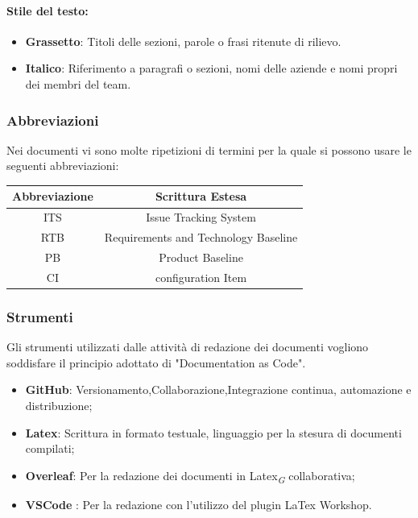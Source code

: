 \documentclass{article}
\begin{document}
\begin{enumerate}
\paragraph*{Stile del testo:}
\begin{itemize}
    \item \textbf{Grassetto}: Titoli delle sezioni, parole o frasi ritenute di rilievo.
    \item \textbf{Italico}: Riferimento a paragrafi o sezioni, nomi delle aziende e nomi propri dei membri del team.
\end{itemize}
\subsubsection{Abbreviazioni}
Nei documenti vi sono molte ripetizioni di termini per la quale si possono usare le seguenti abbreviazioni:\\
\vspace{0.2cm}
\begin{tabular}{|c|c|}
    \hline
    \textbf{Abbreviazione} & \textbf{Scrittura Estesa}            \\
    \hline
    ITS                    & Issue Tracking System                \\
    RTB                    & Requirements and Technology Baseline \\
    PB                     & Product Baseline                     \\
    CI                     & configuration Item                   \\
    \hline
\end{tabular}

\subsubsection{Strumenti}
Gli strumenti utilizzati dalle attività di redazione dei documenti vogliono soddisfare il principio adottato di "Documentation as Code".
\begin{itemize}
    \item \textbf{GitHub}: Versionamento,Collaborazione,Integrazione continua, automazione e distribuzione;
    \item \textbf{Latex}: Scrittura in formato testuale, linguaggio per la stesura di documenti compilati;
    \item \textbf{Overleaf}: Per la redazione dei documenti in Latex\textsubscript{\textit{G}} collaborativa;
    \item \textbf{VSCode} : Per la redazione con l'utilizzo del plugin LaTex Workshop.
\end{itemize}


\end{enumerate}
\end{document}
